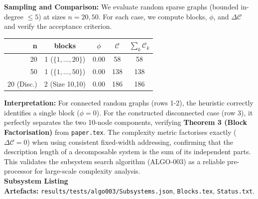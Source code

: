 \documentclass[11pt]{article}
\begin{document}
\textbf{Sampling and Comparison:} We evaluate random sparse graphs (bounded in-degree \(\le 5\)) at sizes \(n=20,50\). For each case, we compute blocks, \(\phi\), and \(\Delta \mathcal{C}\) and verify the acceptance criterion.\\
\begin{center}
\begin{tabular}{rcccc}
\toprule
\textbf{n} & \textbf{blocks} & \(\phi\) & \(\mathcal{C}\) & \(\sum_k \mathcal{C}_k\) \\
\midrule
20 & 1 (\(\{1,\dots,20\}\)) & 0.00 & 58 & 58 \\
50 & 1 (\(\{1,\dots,50\}\)) & 0.00 & 138 & 138 \\
20 (Disc.) & 2 (Size 10,10) & 0.00 & 186 & 186 \\
\bottomrule
\end{tabular}
\end{center}
\textbf{Interpretation:} For connected random graphs (rows 1-2), the heuristic correctly identifies a single block ($\phi=0$). For the constructed disconnected case (row 3), it perfectly separates the two 10-node components, verifying \textbf{Theorem 3 (Block Factorisation)} from \texttt{paper.tex}. The complexity metric factorises exactly ($\Delta \mathcal{C}=0$) when using consistent fixed-width addressing, confirming that the description length of a decomposable system is the sum of its independent parts. This validates the subsystem search algorithm (ALGO-003) as a reliable pre-processor for large-scale complexity analysis.\\
\textbf{Subsystem Listing}\\
\textbf{Artefacts:} \texttt{results/tests/algo003/Subsystems.json}, \texttt{Blocks.tex}, \texttt{Status.txt}.
\end{document}
